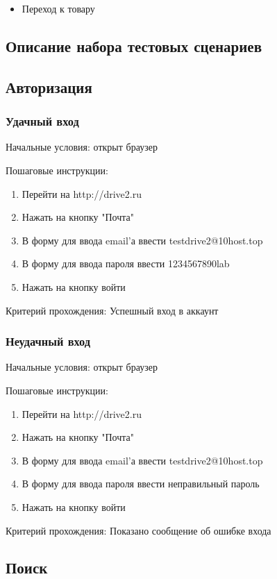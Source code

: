 \begin{itemize}
\item Переход к товару
\end{itemize}

\subsection{Описание набора тестовых сценариев}
\subsection{Авторизация}
\subsubsection{Удачный вход}

Начальные условия: открыт браузер

Пошаговые инструкции:
\begin{enumerate}
\item Перейти на http://drive2.ru
\item Нажать на кнопку "Почта"
\item В форму для ввода email'а ввести testdrive2@10host.top
\item В форму для ввода пароля ввести 1234567890lab
\item Нажать на кнопку войти
\end{enumerate}

Критерий прохождения: Успешный вход в аккаунт

\subsubsection{Неудачный вход}

Начальные условия: открыт браузер

Пошаговые инструкции:
\begin{enumerate}
\item Перейти на http://drive2.ru
\item Нажать на кнопку "Почта"
\item В форму для ввода email'а ввести testdrive2@10host.top
\item В форму для ввода пароля ввести неправильный пароль
\item Нажать на кнопку войти
\end{enumerate}

Критерий прохождения: Показано сообщение об ошибке входа

\subsection{Поиск}

